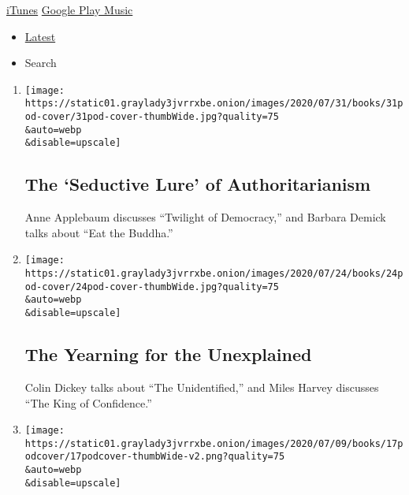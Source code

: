 \href{https://itunes.apple.com/us/podcast/book-review/id120315179?mt=2}{iTunes}
\textbar{}
\href{https://play.google.com/music/listen?u=0\#/ps/Iv6zeb5qwjtzjfbyo3vy5zny5ky}{Google
Play Music}

\begin{itemize}
\tightlist
\item
  \protect\hyperlink{stream-panel}{Latest}
\item
  Search
\end{itemize}

\begin{enumerate}
\def\labelenumi{\arabic{enumi}.}
\item
  \href{/2020/07/31/books/review/podcast-twilight-democracy-anne-applebaum-eat-buddha-barbara-demick.html}{}

  \texttt{[image: https://static01.graylady3jvrrxbe.onion/images/2020/07/31/books/31pod-cover/31pod-cover-thumbWide.jpg?quality=75\\\&auto=webp\\\&disable=upscale]}

  \hypertarget{the-seductive-lure-of-authoritarianism}{%
  \subsection{The `Seductive Lure' of
  Authoritarianism}\label{the-seductive-lure-of-authoritarianism}}

  Anne Applebaum discusses ``Twilight of Democracy,'' and Barbara Demick
  talks about ``Eat the Buddha.''
\item
  \href{/2020/07/24/books/review/podcast-colin-dickey-unexplained-miles-harvey-king-of-confidence.html}{}

  \texttt{[image: https://static01.graylady3jvrrxbe.onion/images/2020/07/24/books/24pod-cover/24pod-cover-thumbWide.jpg?quality=75\\\&auto=webp\\\&disable=upscale]}

  \hypertarget{the-yearning-for-the-unexplained}{%
  \subsection{The Yearning for the
  Unexplained}\label{the-yearning-for-the-unexplained}}

  Colin Dickey talks about ``The Unidentified,'' and Miles Harvey
  discusses ``The King of Confidence.''
\item
  \href{/2020/07/17/books/review/podcast-julian-zelizer-burning-down-house-newt-gingrich-notes-silencing-lacy-crawford.html}{}

  \texttt{[image: https://static01.graylady3jvrrxbe.onion/images/2020/07/09/books/17podcover/17podcover-thumbWide-v2.png?quality=75\\\&auto=webp\\\&disable=upscale]}


\end{enumerate}

